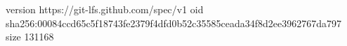 version https://git-lfs.github.com/spec/v1
oid sha256:00084ccd65c5f18743fe2379f4dfd0b52c35585ceada34f8d2ee3962767da797
size 131168
